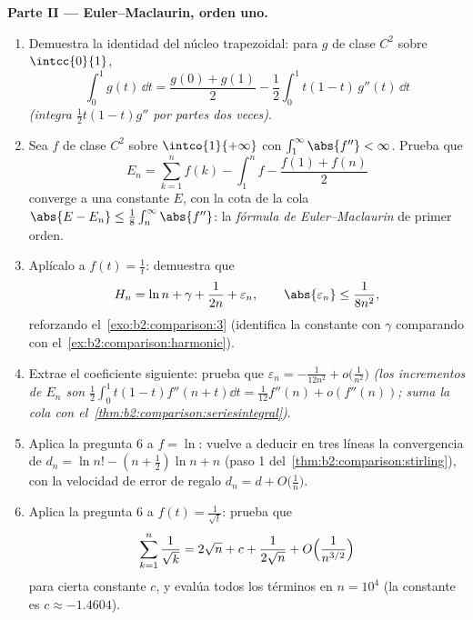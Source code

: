 \begin{problem}
\medskip
\noindent\textbf{Parte II --- Euler--Maclaurin, orden uno.}
\begin{enumerate}[resume]
  \item Demuestra la identidad del núcleo trapezoidal: para $g$ de
        clase $C^2$ sobre $\intcc{0}{1}$,
        \[
        \int_0^1 g(t)\,\dd t = \frac{g(0) + g(1)}{2}
        - \frac12\int_0^1 t(1 - t)\,g''(t)\,\dd t
        \]
        \emph{(integra $\frac12 t(1-t)g''$ por partes dos veces)}.
  \item Sea $f$ de clase $C^2$ sobre $\intco{1}{+\infty}$ con
        $\int_1^\infty \abs{f''} < \infty$. Prueba que
        \[
        E_n = \sum_{k=1}^{n} f(k) - \int_1^n f -
        \frac{f(1) + f(n)}{2}
        \]
        converge a una constante $E$, con la cota de la cola
        $\abs{E - E_n} \leq \frac18\int_n^\infty\abs{f''}$: la
        \emph{fórmula de Euler--Maclaurin} de primer orden.
  \item Aplícalo a $f(t) = \frac1t$: demuestra que
        \[
        H_n = \ln n + \gamma + \frac{1}{2n} + \varepsilon_n,
        \qquad \abs{\varepsilon_n} \leq \frac{1}{8n^2},
        \]
        reforzando el~\cref{exo:b2:comparison:3} (identifica la
        constante con $\gamma$ comparando con el~\cref{ex:b2:comparison:harmonic}).
  \item Extrae el coeficiente siguiente: prueba que $\varepsilon_n
        = -\frac{1}{12n^2} + o\bigl(\frac1{n^2}\bigr)$ \emph{(los
        incrementos de $E_n$ son $\frac12\int_0^1t(1-t)f''(n+t)\dd t
        = \frac1{12}f''(n) + o(f''(n))$; suma la cola con el~\cref{thm:b2:comparison:seriesintegral})}.
  \item Aplica la pregunta 6 a $f = \ln$: vuelve a deducir en tres
        líneas la convergencia de $d_n = \ln n! - (n + \frac12)\ln n
        + n$ (paso 1 del~\cref{thm:b2:comparison:stirling}), con la
        velocidad de error de regalo $d_n = d + O\bigl(\frac1n\bigr)$.
  \item Aplica la pregunta 6 a $f(t) = \frac{1}{\sqrt t}$: prueba
        que
        \[
        \sum_{k=1}^{n}\frac1{\sqrt k} = 2\sqrt n + c +
        \frac{1}{2\sqrt n} + O\Bigl(\frac{1}{n^{3/2}}\Bigr)
        \]
        para cierta constante $c$, y evalúa todos los términos en $n
        = 10^4$ (la constante es $c \approx -1.4604$).
\end{enumerate}


\end{problem}
